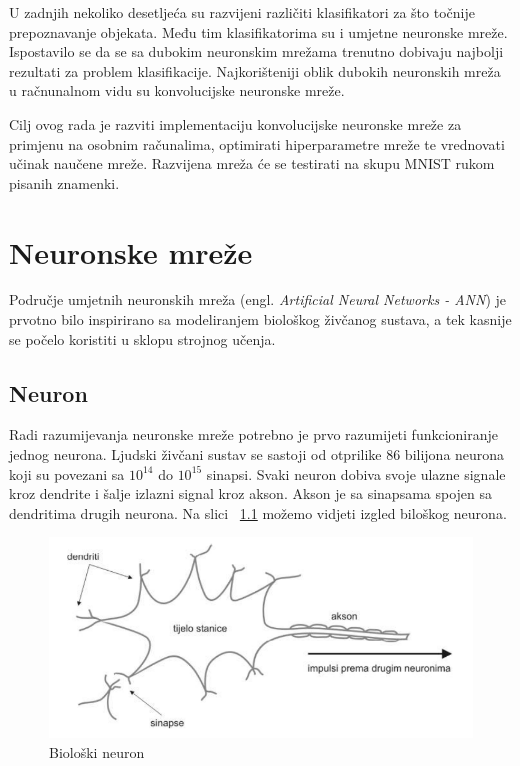 \documentclass[times, utf8, zavrsni]{fer}
\begin{document}
U zadnjih nekoliko desetljeća su razvijeni različiti klasifikatori za što točnije prepoznavanje objekata. Među tim klasifikatorima su i umjetne neuronske mreže. Ispostavilo se da se sa dubokim neuronskim mrežama trenutno dobivaju najbolji rezultati za problem klasifikacije. Najkorišteniji oblik dubokih neuronskih mreža u račnunalnom vidu su konvolucijske neuronske mreže.

Cilj ovog rada je razviti implementaciju konvolucijske neuronske mreže za primjenu na osobnim računalima, optimirati hiperparametre mreže te vrednovati učinak naučene mreže. Razvijena mreža će se testirati na skupu MNIST rukom pisanih znamenki.
\chapter{Neuronske mreže}
Područje umjetnih neuronskih mreža (engl. \textit{Artificial Neural Networks - ANN}) je prvotno bilo inspirirano sa modeliranjem biološkog živčanog sustava, a tek kasnije se počelo koristiti u sklopu strojnog učenja. 
\section{Neuron}
Radi razumijevanja neuronske mreže potrebno je prvo razumijeti funkcioniranje jednog neurona. Ljudski živčani sustav se sastoji od otprilike 86 bilijona neurona koji su povezani sa $10^{14}$ do $10^{15}$ sinapsi. Svaki neuron dobiva svoje ulazne signale kroz dendrite i šalje izlazni signal kroz akson. Akson je sa sinapsama spojen sa dendritima drugih neurona. Na slici ~\ref{fig:bio-neuron} možemo vidjeti izgled biloškog neurona.
\begin{figure}
    \centering
    \includegraphics[width=12cm]{img/bio-neuron.png}
    \caption{Biološki neuron}
    \label{fig:bio-neuron}
\end{figure}
\end{document}
